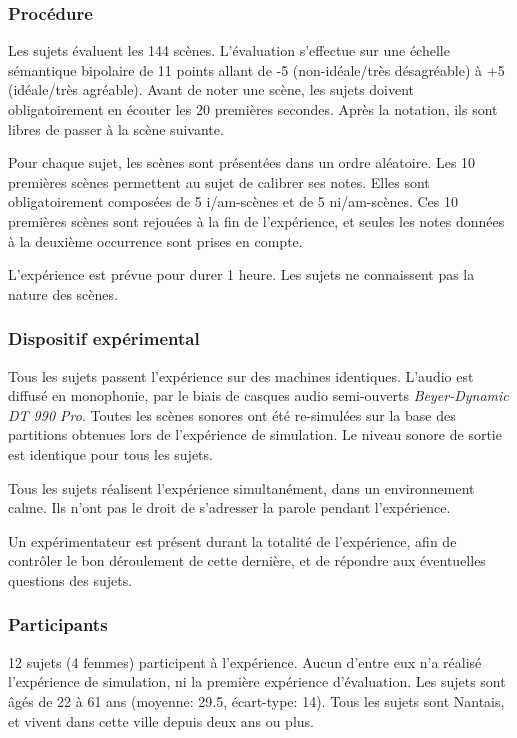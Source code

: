 \documentclass[twoside,twocolumn]{article}
\begin{document}
\subsubsection*{Procédure}

Les sujets évaluent les 144 scènes. L'évaluation s'effectue sur une échelle sémantique bipolaire de 11 points allant de -5 (non-idéale/très désagréable) à +5 (idéale/très agréable). Avant de noter une scène, les sujets doivent obligatoirement en écouter les 20 premières secondes. Après la notation, ils sont libres de passer à la scène suivante.

Pour chaque sujet, les scènes sont présentées dans un ordre aléatoire. Les 10 premières scènes permettent au sujet de calibrer ses notes. Elles sont obligatoirement composées de 5 i/am-scènes et de 5 ni/am-scènes. Ces 10 premières scènes sont rejouées à la fin de l'expérience, et seules les notes données à la deuxième occurrence sont prises en compte.

L'expérience est prévue pour durer 1 heure. Les sujets ne connaissent pas la nature des scènes.

\subsubsection*{Dispositif expérimental}

Tous les sujets passent l'expérience sur des machines identiques. L'audio est diffusé en monophonie, par le biais de casques audio semi-ouverts \emph{Beyer-Dynamic DT 990 Pro}. Toutes les scènes sonores ont été re-simulées sur la base des partitions obtenues lors de l'expérience de simulation. Le niveau sonore de sortie est identique pour tous les sujets.

Tous les sujets réalisent l'expérience simultanément, dans un environnement calme. Ils n'ont pas le droit de s'adresser la parole pendant l'expérience.

Un expérimentateur est présent durant la totalité de l'expérience, afin de contrôler le bon déroulement de cette dernière, et de répondre aux éventuelles questions des sujets.

\subsubsection*{Participants}

12 sujets (4 femmes) participent à l'expérience. Aucun d'entre eux n'a réalisé l'expérience de simulation, ni la première expérience d'évaluation. Les sujets sont âgés de 22 à 61 ans (moyenne: 29.5, écart-type: 14). Tous les sujets sont Nantais, et vivent dans cette ville depuis deux ans ou plus.
\end{document}
